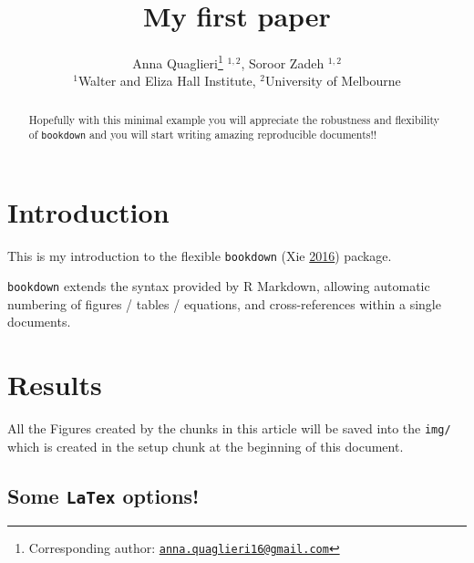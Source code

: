 \documentclass[12pt,]{article}
\title{My first paper}
\author{Anna Quaglieri\footnote{Corresponding author:
  \href{mailto:anna.quaglieri16@gmail.com}{\nolinkurl{anna.quaglieri16@gmail.com}}}
\(^{1,2}\), Soroor Zadeh \(^{1,2}\)\\
\(^1\)Walter and Eliza Hall Institute, \(^2\)University of Melbourne}
\date{}
\newenvironment{Shaded}{\begin{snugshade}}{\end{snugshade}}
\newcommand{\KeywordTok}[1]{\textcolor[rgb]{0.13,0.29,0.53}{\textbf{#1}}}
\newcommand{\DataTypeTok}[1]{\textcolor[rgb]{0.13,0.29,0.53}{#1}}
\newcommand{\DecValTok}[1]{\textcolor[rgb]{0.00,0.00,0.81}{#1}}
\newcommand{\StringTok}[1]{\textcolor[rgb]{0.31,0.60,0.02}{#1}}
\newcommand{\OtherTok}[1]{\textcolor[rgb]{0.56,0.35,0.01}{#1}}
\newcommand{\OperatorTok}[1]{\textcolor[rgb]{0.81,0.36,0.00}{\textbf{#1}}}
\newcommand{\NormalTok}[1]{#1}
\begin{document}
\maketitle
\begin{abstract}
Hopefully with this minimal example you will appreciate the robustness
and flexibility of \texttt{bookdown} and you will start writing amazing
reproducible documents!!
\end{abstract}

{
\setcounter{tocdepth}{2}
\tableofcontents
}
\newpage

\section{Introduction}\label{introduction}

\label{sec:intro}

This is my introduction to the flexible \texttt{bookdown} (Xie
\protect\hyperlink{ref-bookdown}{2016}) package.

\texttt{bookdown} extends the syntax provided by R Markdown, allowing
automatic numbering of figures / tables / equations, and
cross-references within a single documents.

\section{Results}\label{results}

\label{sec:res}

All the Figures created by the chunks in this article will be saved into
the \texttt{img/} which is created in the setup chunk at the beginning
of this document.

\begin{Shaded}
\end{Shaded}

\subsection{\texorpdfstring{Some \texttt{LaTex}
options!}{Some LaTex options!}}\label{some-latex-options}
\end{document}
